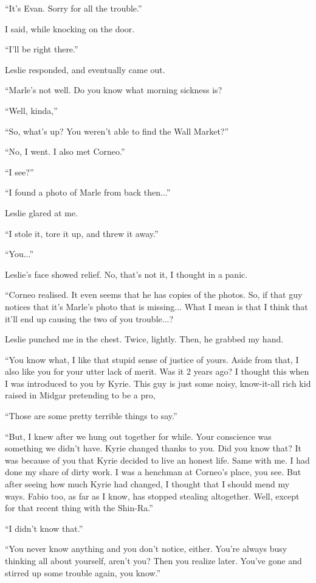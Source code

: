 \documentclass[oneside]{book}
\begin{document}
“It’s Evan. Sorry for all the trouble.”

I said, while knocking on the door.

“I’ll be right there.”

Leslie responded, and eventually came out.

“Marle’s not well. Do you know what morning sickness is?

“Well, kinda,”

“So, what’s up? You weren’t able to find the Wall Market?”

“No, I went. I also met Corneo.”

“I see?”

“I found a photo of Marle from back then...”

Leslie glared at me.

“I stole it, tore it up, and threw it away.”

“You...”

Leslie’s face showed relief. No, that’s not it, I thought in a panic.

“Corneo realised. It even seems that he has copies of the photos. So, if that guy notices that it’s Marle’s photo that is missing... What I mean is that I think that it’ll end up causing the two of you trouble...?

Leslie punched me in the chest. Twice, lightly. Then, he grabbed my hand.

“You know what, I like that stupid sense of justice of yours. Aside from that, I also like you for your utter lack of merit. Was it 2 years ago? I thought this when I was introduced to you by Kyrie. This guy is just some noisy, know-it-all rich kid raised in Midgar pretending to be a pro,

“Those are some pretty terrible things to say.”

“But, I knew after we hung out together for while. Your conscience was something we didn’t have. Kyrie changed thanks to you. Did you know that? It was because of you that Kyrie decided to live an honest life. Same with me. I had done my share of dirty work. I was a henchman at Corneo’s place, you see. But after seeing how much Kyrie had changed, I thought that I should mend my ways. Fabio too, as far as I know, has stopped stealing altogether. Well, except for that recent thing with the Shin-Ra.”

“I didn’t know that.”

“You never know anything and you don’t notice, either. You’re always busy thinking all about yourself, aren’t you? Then you realize later. You’ve gone and stirred up some trouble again, you know.”
\end{document}
